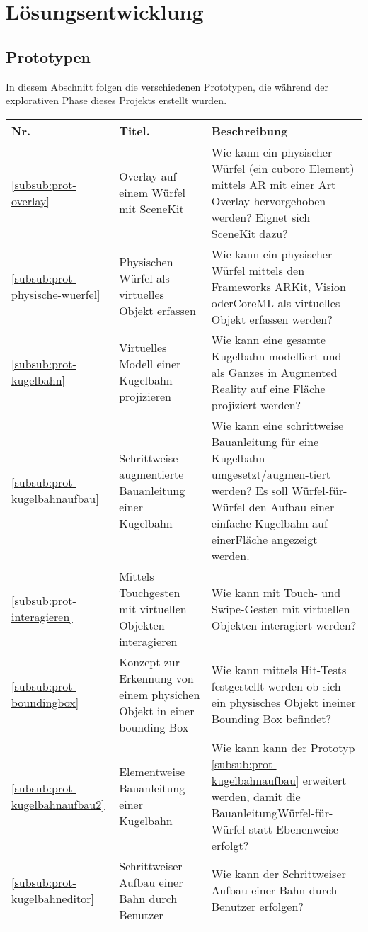 \section{Lösungsentwicklung}

\subsection{Prototypen}

In diesem Abschnitt folgen die verschiedenen Prototypen, die während der explorativen Phase dieses Projekts erstellt wurden.

\begin{longtable}{l p{6cm} p{8cm}}
	\hline
	\textbf{Nr.} & \textbf{Titel.} & \textbf{Beschreibung} \\
	\hline
	\ref{subsub:prot-overlay} & Overlay auf einem Würfel mit SceneKit & Wie kann ein physischer Würfel (ein cuboro Element) mittels AR mit einer Art Overlay hervorgehoben werden? Eignet sich SceneKit dazu? \\
  \ref{subsub:prot-physische-wuerfel} & Physischen Würfel als virtuelles Objekt erfassen & Wie kann ein physischer Würfel mittels den Frameworks ARKit, Vision oderCoreML als virtuelles Objekt erfassen werden? \\
  \ref{subsub:prot-kugelbahn} & Virtuelles Modell einer Kugelbahn projizieren & Wie kann eine gesamte Kugelbahn modelliert und als Ganzes in Augmented Reality auf eine Fläche projiziert werden? \\
  \ref{subsub:prot-kugelbahnaufbau} & Schrittweise augmentierte Bauanleitung einer Kugelbahn & Wie kann eine schrittweise Bauanleitung für eine Kugelbahn umgesetzt/augmen-tiert werden? Es soll Würfel-für-Würfel den Aufbau einer einfache Kugelbahn auf einerFläche angezeigt werden.  \\
  \ref{subsub:prot-interagieren} & Mittels Touchgesten mit virtuellen Objekten interagieren & Wie kann mit Touch- und Swipe-Gesten mit virtuellen Objekten interagiert werden? \\
  \ref{subsub:prot-boundingbox} & Konzept zur Erkennung von einem physichen Objekt in einer bounding Box & Wie kann mittels Hit-Tests festgestellt werden ob sich ein physisches Objekt ineiner Bounding Box befindet? \\
  \ref{subsub:prot-kugelbahnaufbau2} & Elementweise Bauanleitung einer Kugelbahn & Wie kann kann der Prototyp \ref{subsub:prot-kugelbahnaufbau} erweitert werden, damit die BauanleitungWürfel-für-Würfel statt Ebenenweise erfolgt? \\
  \ref{subsub:prot-kugelbahneditor} & Schrittweiser Aufbau einer Bahn durch Benutzer & Wie kann der Schrittweiser Aufbau einer Bahn durch Benutzer erfolgen? \\
	\hline
\end{longtable}

